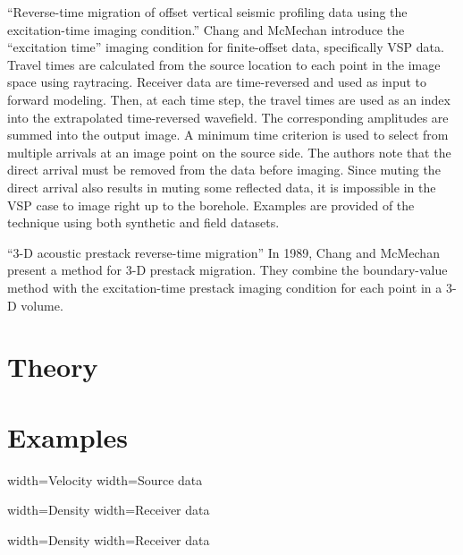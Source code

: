 ``Reverse-time migration of offset vertical seismic profiling data
using the excitation-time imaging condition.'' Chang and McMechan
introduce the ``excitation time'' imaging condition for finite-offset
data, specifically VSP data. Travel times are calculated from the
source location to each point in the image space using
raytracing. Receiver data are time-reversed and used as input to
forward modeling. Then, at each time step, the travel times are used
as an index into the extrapolated time-reversed wavefield.  The
corresponding amplitudes are summed into the output image.  A minimum
time criterion is used to select from multiple arrivals at an image
point on the source side. The authors note that the direct arrival
must be removed from the data before imaging.  Since muting the direct
arrival also results in muting some reflected data, it is impossible
in the VSP case to image right up to the borehole.  Examples are
provided of the technique using both synthetic and field datasets.
\citep{changmechmechan1986}

``3-D acoustic prestack reverse-time migration'' In 1989, Chang and
McMechan present a method for 3-D prestack migration.  They combine
the boundary-value method with the excitation-time prestack imaging
condition for each point in a 3-D volume.\citep{changandmcmechan1989b}

\section{Theory}

\section{Examples}


   {width=\textwidth}{Velocity}
   {width=\textwidth}{Source data}

  {width=\textwidth}{Density}
  {width=\textwidth}{Receiver data}

  {width=\textwidth}{Density}
  {width=\textwidth}{Receiver data}


\nocite{*}


